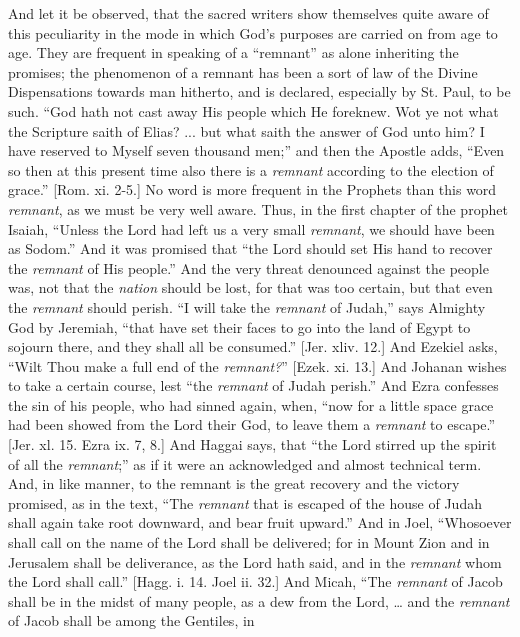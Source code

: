 And let it be observed, that the sacred writers show themselves
quite aware of this peculiarity in the mode in which God's purposes
are carried on from age to age. They are frequent in speaking of a
``remnant'' as alone inheriting the promises; the phenomenon
of a remnant has been a sort of law of the Divine Dispensations
towards man hitherto, and is declared, especially by St. Paul, to be
such. ``God hath not cast away His people which He foreknew. Wot
ye not what the Scripture saith of Elias? ... but what saith the
answer of God unto him? I have reserved to Myself seven thousand
men;'' and then the Apostle adds, ``Even so then at this
present time also there is a \emph{remnant} according to the election
of grace.'' [Rom. xi. 2-5.] No word is more frequent in the
Prophets than this word \emph{remnant}, as we must be very well aware.
Thus, in the first chapter of the prophet Isaiah, ``Unless the
Lord had left us a very small \emph{remnant}, we should have been as
Sodom.'' And it was promised that ``the Lord should set His
hand to recover the \emph{remnant} of His people.'' And the very
threat denounced against the people was, not that the \emph{nation}
should be lost, for that was too certain, but that even the \emph{remnant}
should perish. ``I will take the \emph{remnant} of Judah,''
says Almighty God by Jeremiah, ``that have set their faces to go
into the land of Egypt to sojourn there, and they shall all be
consumed.'' [Jer. xliv. 12.] And Ezekiel asks, ``Wilt Thou
make a full end of the \emph{remnant?}'' [Ezek. xi. 13.] And
Johanan wishes to take a certain course, lest ``the \emph{remnant}
of Judah perish.'' And Ezra confesses the sin of his people, who
had sinned again, when, ``now for a little space grace had been
showed from the Lord their God, to leave them a \emph{remnant} to
escape.'' [Jer. xl. 15. Ezra ix. 7, 8.] And Haggai says, that
``the Lord stirred up the spirit of all the \emph{remnant};''
as if it were an acknowledged and almost technical term. And, in like
manner, to the remnant is the great recovery and the victory promised,
as in the text, ``The \emph{remnant} that is escaped of the house
of Judah shall again take root downward, and bear fruit upward.''
And in Joel, ``Whosoever shall call on the name of the Lord shall
be delivered; for in Mount Zion and in Jerusalem shall be deliverance,
as the Lord hath said, and in the \emph{remnant} whom the Lord shall
call.'' [Hagg. i. 14. Joel ii. 32.] And Micah, ``The \emph{remnant}
of Jacob shall be in the midst of many people, as a dew from the Lord,
… and the \emph{remnant} of Jacob shall be among the Gentiles, in
